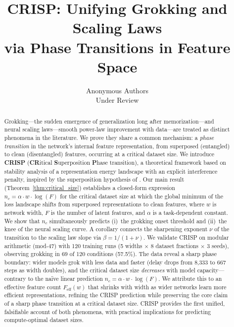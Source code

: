 \documentclass{article}
\title{CRISP: Unifying Grokking and Scaling Laws\\ via Phase Transitions in Feature Space}
\author{
  Anonymous Authors\\
  Under Review
}
\newcommand{\nc}{n_c}
\newcommand{\Fnum}{F}
\begin{document}
\maketitle

\begin{abstract}
Grokking---the sudden emergence of generalization long after memorization---and neural scaling laws---smooth power-law improvement with data---are treated as distinct phenomena in the literature.
We prove they share a common mechanism: a \emph{phase transition} in the network's internal feature representation, from superposed (entangled) to clean (disentangled) features, occurring at a critical dataset size.
We introduce \textbf{CRISP} (\textbf{CR}itical \textbf{S}uperposition \textbf{P}hase transition), a theoretical framework based on stability analysis of a representation energy landscape with an explicit interference penalty, inspired by the superposition hypothesis of \citet{elhage2022toy}.
Our main result (Theorem~\ref{thm:critical_size}) establishes a closed-form expression $\nc = \alpha \cdot w \cdot \log(\Fnum)$ for the critical dataset size at which the global minimum of the loss landscape shifts from superposed representations to clean features, where $w$ is network width, $\Fnum$ is the number of latent features, and $\alpha$ is a task-dependent constant.
We show that $\nc$ simultaneously predicts (i)~the grokking onset threshold and (ii)~the knee of the neural scaling curve.
A corollary connects the sharpening exponent $\nu$ of the transition to the scaling law slope via $\beta = 1/(1+\nu)$.
We validate CRISP on modular arithmetic (mod-47) with 120 training runs (5 widths $\times$ 8 dataset fractions $\times$ 3 seeds), observing grokking in 69 of 120 conditions (57.5\%).
The data reveal a sharp phase boundary: wider models grok with less data and faster (delay drops from 8{,}333 to 667 steps as width doubles), and the critical dataset size \emph{decreases} with model capacity---contrary to the na\"ive linear prediction $\nc = \alpha \cdot w \cdot \log(\Fnum)$.
We attribute this to an effective feature count $F_{\text{eff}}(w)$ that shrinks with width as wider networks learn more efficient representations, refining the CRISP prediction while preserving the core claim of a sharp phase transition at a critical dataset size.
CRISP provides the first unified, falsifiable account of both phenomena, with practical implications for predicting compute-optimal dataset sizes.
\end{abstract}
\end{document}
